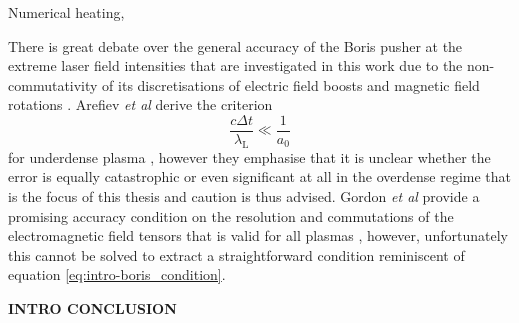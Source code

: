 


Numerical heating, 

There is great debate over the general accuracy of the Boris pusher at the extreme laser field intensities that are investigated in this work due to the non-commutativity of its discretisations of electric field boosts and magnetic field rotations \cite{arefievTemporalResolutionCriterion2015, gordonSpecialUnitaryParticle2021}. Arefiev \textit{et al} derive the criterion 
\begin{equation}\label{eq:intro-boris_condition}
	\frac{c\Delta t }{\lambda_\mathrm{L}} \ll \frac{1}{a_0}
\end{equation}
for underdense plasma \cite{arefievTemporalResolutionCriterion2015}, however they emphasise that it is unclear whether the error is equally catastrophic or even significant at all in the overdense regime that is the focus of this thesis and caution is thus advised. Gordon \textit{et al} provide a promising accuracy condition on the resolution and commutations of the electromagnetic field tensors that is valid for all plasmas \cite{gordonSpecialUnitaryParticle2021}, however, unfortunately this cannot be solved to extract a straightforward condition reminiscent of equation \ref{eq:intro-boris_condition}.


\textbf{INTRO CONCLUSION}
